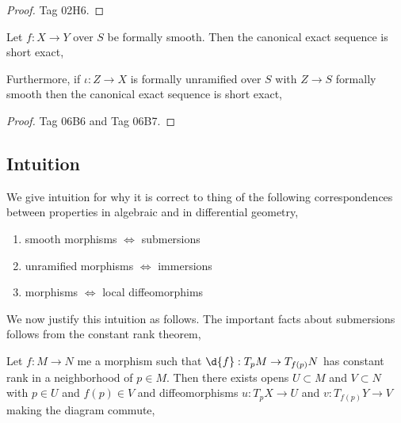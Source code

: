 \documentclass[12pt]{article}
\begin{document}
\begin{proof}
Tag 02H6.
\end{proof}

\begin{prop}
Let $f : X \to Y$ over $S$ be formally smooth. Then the canonical exact sequence is short exact,
\begin{center}
\end{center}
Furthermore, if $\iota : Z \to X$ is formally unramified over $S$ with $Z \to S$ formally smooth then the canonical exact sequence is short exact,
\begin{center}
\end{center}
\end{prop}

\begin{proof}
Tag 06B6 and Tag 06B7.
\end{proof}

\subsection{Intuition}

\begin{rmk}
We give intuition for why it is correct to thing of the following correspondences between properties in algebraic and in differential geometry,
\begin{enumerate}
\item smooth morphisms $\iff$ submersions
\item unramified morphisms $\iff$ immersions
\item \etale morphisms $\iff$ local diffeomorphims
\end{enumerate}
\end{rmk}

\noindent
We now justify this intuition as follows. The important facts about submersions follows from the constant rank theorem,

\begin{theorem}
Let $f : M \to N$ me a morphism such that $\d{f} : T_p M \to T_{f(p)} N$ has constant rank in a neighborhood of $p \in M$. Then there exists opens $U \subset M$ and $V \subset N$ with $p \in U$ and $f(p) \in V$ and diffeomorphisms $u : T_p X \to U$ and $v : T_{f(p)} Y \to V$ making the diagram commute,
\begin{center}
\end{center} 
\end{theorem}
\end{document}
